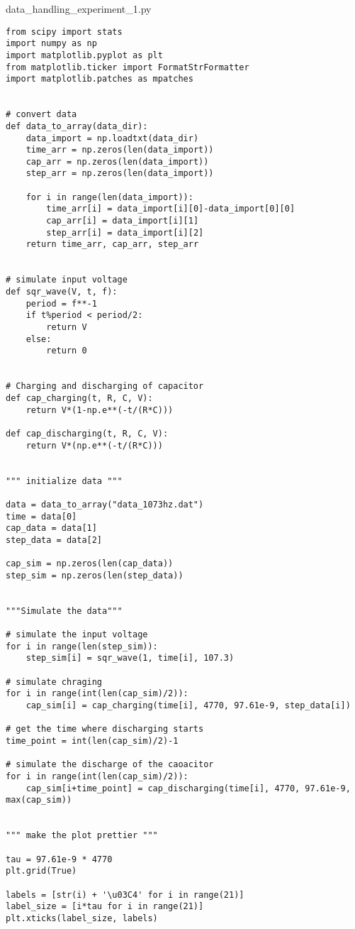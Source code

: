 \lstset{language=Python}
\lstset{frame=lines}
\lstset{numbers = left}
\lstlistingname{ data\_handling\_experiment\_1.py}
\begin{lstlisting}[breaklines]
from scipy import stats
import numpy as np
import matplotlib.pyplot as plt
from matplotlib.ticker import FormatStrFormatter
import matplotlib.patches as mpatches


# convert data
def data_to_array(data_dir): 
    data_import = np.loadtxt(data_dir)
    time_arr = np.zeros(len(data_import))
    cap_arr = np.zeros(len(data_import))
    step_arr = np.zeros(len(data_import))

    for i in range(len(data_import)):
        time_arr[i] = data_import[i][0]-data_import[0][0]
        cap_arr[i] = data_import[i][1]
        step_arr[i] = data_import[i][2]
    return time_arr, cap_arr, step_arr


# simulate input voltage
def sqr_wave(V, t, f): 
    period = f**-1
    if t%period < period/2:
        return V
    else:
        return 0


# Charging and discharging of capacitor
def cap_charging(t, R, C, V): 
    return V*(1-np.e**(-t/(R*C)))

def cap_discharging(t, R, C, V):
    return V*(np.e**(-t/(R*C))) 


""" initialize data """
    
data = data_to_array("data_1073hz.dat")
time = data[0]
cap_data = data[1]
step_data = data[2]

cap_sim = np.zeros(len(cap_data))
step_sim = np.zeros(len(step_data))


"""Simulate the data"""

# simulate the input voltage
for i in range(len(step_sim)):
    step_sim[i] = sqr_wave(1, time[i], 107.3)

# simulate chraging
for i in range(int(len(cap_sim)/2)):
    cap_sim[i] = cap_charging(time[i], 4770, 97.61e-9, step_data[i])

# get the time where discharging starts
time_point = int(len(cap_sim)/2)-1

# simulate the discharge of the caoacitor
for i in range(int(len(cap_sim)/2)):
    cap_sim[i+time_point] = cap_discharging(time[i], 4770, 97.61e-9, max(cap_sim))
    

""" make the plot prettier """

tau = 97.61e-9 * 4770
plt.grid(True)                     

labels = [str(i) + '\u03C4' for i in range(21)]                     
label_size = [i*tau for i in range(21)]                             
plt.xticks(label_size, labels)                                      


\end{lstlisting}
